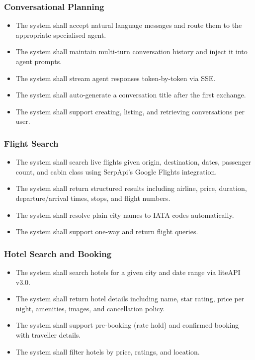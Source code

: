 \documentclass[12pt, a4paper]{article}
\begin{document}
\subsubsection{Conversational Planning}
\begin{itemize}[leftmargin=1.5cm, itemsep=0.3em]
  \item The system shall accept natural language messages and route them to the appropriate specialised agent.
  \item The system shall maintain multi-turn conversation history and inject it into agent prompts.
  \item The system shall stream agent responses token-by-token via SSE.
  \item The system shall auto-generate a conversation title after the first exchange.
  \item The system shall support creating, listing, and retrieving conversations per user.
\end{itemize}

\subsubsection{Flight Search}
\begin{itemize}[leftmargin=1.5cm, itemsep=0.3em]
  \item The system shall search live flights given origin, destination, dates, passenger count, and cabin class using SerpApi's Google Flights integration.
  \item The system shall return structured results including airline, price, duration, departure/arrival times, stops, and flight numbers.
  \item The system shall resolve plain city names to IATA codes automatically.
  \item The system shall support one-way and return flight queries.
\end{itemize}

\subsubsection{Hotel Search and Booking}
\begin{itemize}[leftmargin=1.5cm, itemsep=0.3em]
  \item The system shall search hotels for a given city and date range via liteAPI v3.0.
  \item The system shall return hotel details including name, star rating, price per night, amenities, images, and cancellation policy.
  \item The system shall support pre-booking (rate hold) and confirmed booking with traveller details.
  \item The system shall filter hotels by price, ratings, and location.
\end{itemize}
\end{document}

